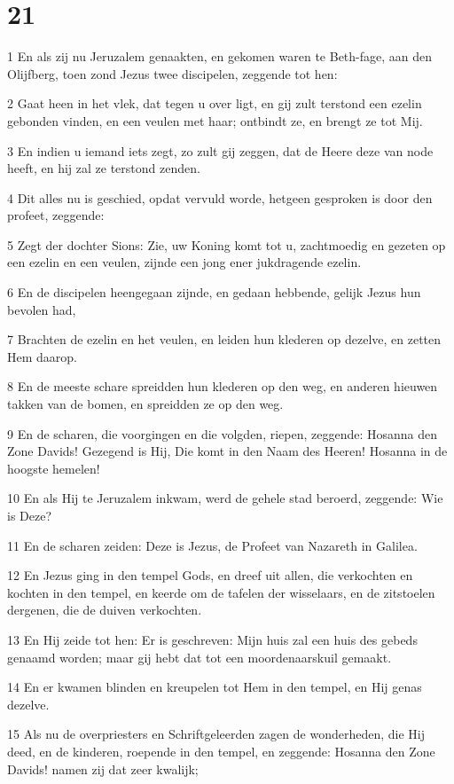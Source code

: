 \chapter{21}

\par 1 En als zij nu Jeruzalem genaakten, en gekomen waren te Beth-fage, aan den Olijfberg, toen zond Jezus twee discipelen, zeggende tot hen:
\par 2 Gaat heen in het vlek, dat tegen u over ligt, en gij zult terstond een ezelin gebonden vinden, en een veulen met haar; ontbindt ze, en brengt ze tot Mij.
\par 3 En indien u iemand iets zegt, zo zult gij zeggen, dat de Heere deze van node heeft, en hij zal ze terstond zenden.
\par 4 Dit alles nu is geschied, opdat vervuld worde, hetgeen gesproken is door den profeet, zeggende:
\par 5 Zegt der dochter Sions: Zie, uw Koning komt tot u, zachtmoedig en gezeten op een ezelin en een veulen, zijnde een jong ener jukdragende ezelin.
\par 6 En de discipelen heengegaan zijnde, en gedaan hebbende, gelijk Jezus hun bevolen had,
\par 7 Brachten de ezelin en het veulen, en leiden hun klederen op dezelve, en zetten Hem daarop.
\par 8 En de meeste schare spreidden hun klederen op den weg, en anderen hieuwen takken van de bomen, en spreidden ze op den weg.
\par 9 En de scharen, die voorgingen en die volgden, riepen, zeggende: Hosanna den Zone Davids! Gezegend is Hij, Die komt in den Naam des Heeren! Hosanna in de hoogste hemelen!
\par 10 En als Hij te Jeruzalem inkwam, werd de gehele stad beroerd, zeggende: Wie is Deze?
\par 11 En de scharen zeiden: Deze is Jezus, de Profeet van Nazareth in Galilea.
\par 12 En Jezus ging in den tempel Gods, en dreef uit allen, die verkochten en kochten in den tempel, en keerde om de tafelen der wisselaars, en de zitstoelen dergenen, die de duiven verkochten.
\par 13 En Hij zeide tot hen: Er is geschreven: Mijn huis zal een huis des gebeds genaamd worden; maar gij hebt dat tot een moordenaarskuil gemaakt.
\par 14 En er kwamen blinden en kreupelen tot Hem in den tempel, en Hij genas dezelve.
\par 15 Als nu de overpriesters en Schriftgeleerden zagen de wonderheden, die Hij deed, en de kinderen, roepende in den tempel, en zeggende: Hosanna den Zone Davids! namen zij dat zeer kwalijk;
